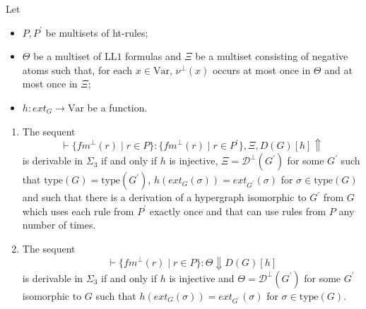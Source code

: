 \documentclass[a4paper,UKenglish,cleveref, autoref, thm-restate,pdfa]{lipics-v2021}
\newcommand{\ext}{\mathit{ext}}
\newcommand{\type}{\mathrm{type}}
\newcommand{\Var}{\mathrm{Var}}
\newcommand{\LLFO}{\mathrm{LL}1}
\newcommand{\fm}{\mathit{fm}}
\newcommand{\diag}{\mathcal{D}}
\begin{document}
\begin{lemma}\label{lemma:main-appendix}
	\leavevmode
	Let 
	\begin{itemize}
		\item $P,P^\prime$ be multisets of ht-rules; 
		\item $\Theta$ be a multiset of $\LLFO$ formulas and $\Xi$ be a multiset consisting of negative atoms such that, for each $x \in \Var$, $\nu^\bot(x)$ occurs at most once in $\Theta$ and at most once in $\Xi$; 
		\item $h:\ext_G \to \Var$ be a function. 
	\end{itemize}
	\begin{enumerate}
		\item The sequent 
		\begin{equation}\label{equation:sequent-fm-1}
			\vdash \{\fm^\bot(r) \mid r \in P\} : \{\fm^\bot(r) \mid r \in P^\prime\}, \Xi, D(G)[h] \Uparrow
		\end{equation}
		is derivable in $\Sigma_3$ if and only if $h$ is injective, $\Xi=\diag^\bot(G^\prime)$ for some $G^\prime$ such that $\type(G)=\type(G^\prime)$, $h(\ext_G(\sigma)) = \ext_{G^\prime}(\sigma)$ for $\sigma \in \type(G)$ and such that there is a derivation of a hypergraph isomorphic to $G^\prime$ from $G$ which uses each rule from $P^\prime$ exactly once and that can use rules from $P$ any number of times.
		\item The sequent 
		\begin{equation}\label{equation:sequent-fm-2}
			\vdash \{\fm^\bot(r) \mid r \in P\} : \Theta \Downarrow D(G)[h]
		\end{equation}
		is derivable in $\Sigma_3$ if and only if $h$ is injective and $\Theta=\diag^\bot(G^\prime)$ for some $G^\prime$ isomorphic to $G$ such that $h(\ext_G(\sigma)) = \ext_{G^\prime}(\sigma)$ for $\sigma \in \type(G)$.
	\end{enumerate}
\end{lemma}
\end{document}
